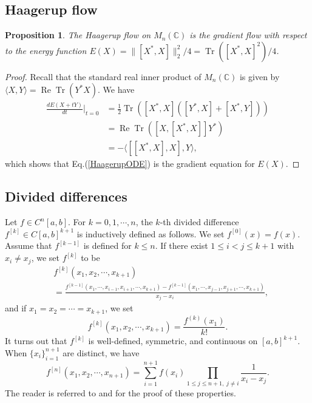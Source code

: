 \documentclass[12pt]{article}
\newtheorem{proposition}[theorem]{Proposition}
\theoremstyle{definition}
\numberwithin{equation}{section}
\newcommand{\C}{\mathbb{C}}
\DeclareMathOperator{\Tr}{Tr}
\renewcommand{\Re}{\operatorname{Re}}
\newcommand{\inpr}[2]{\langle{#1,#2}\rangle}
\begin{document}
\subsection{Haagerup flow}
\begin{proposition}\label{gradient} The Haagerup flow on $M_n(\C)$ is the gradient flow with respect to 
	the energy function $E(X)=\|[X^*,X]\|_2^2/4=\Tr([X^*,X]^2)/4$. 
\end{proposition}

\begin{proof}
	Recall that the standard real inner product of $M_n(\C)$ is given by 
	$\inpr{X}{Y}=\Re\Tr(Y^*X)$.  	
	We have 
	\begin{align*}
		\frac{dE(X+tY)}{dt}{\bigg|}_{t=0} &=\frac{1}{2}\Tr([X^*,X]([Y^*,X]+[X^*,Y]))\\
		&=\Re \Tr([X,[X^*,X]]Y^*)\\
		&=-\inpr{[[X^*,X],X]}{Y},
	\end{align*}
	which shows that Eq.(\ref{HaagerupODE}) is the gradient equation for $E(X)$. 
\end{proof}

\subsection{Divided differences}
Let $f\in C^n[a,b]$. 
For $k=0,1,\cdots, n$, the $k$-th divided difference $f^{[k]}\in C[a,b]^{k+1}$ is inductively defined as follows. 
We set $f^{[0]}(x)=f(x)$. 
Assume that $f^{[k-1]}$ is defined for $k\leq n$. 
If there exist $1\leq i<j\leq k+1$ with $x_i\neq x_j$, we set $f^{[k]}$ to be
\begin{align*}
	 &f^{[k]}(x_1,x_2,\cdots,x_{k+1})  \\
	&= \frac{f^{[k-1]}(x_1,\cdots,x_{i-1},x_{i+1},\cdots, x_{k+1})-f^{[k-1]}(x_1,\cdots,x_{j-1},x_{j+1},\cdots,x_{k+1})}{x_j-x_i},
\end{align*}
and if $x_1=x_2=\cdots=x_{k+1}$, we set 
\[f^{[k]}(x_1,x_2,\cdots,x_{k+1}) =\frac{f^{(k)}(x_1)}{k!}.\]
It turns out that $f^{[k]}$ is well-defined, symmetric, and continuous on $[a,b]^{k+1}$. 
When $\{x_i\}_{i=1}^{n+1}$ are distinct, we have 
\[f^{[n]}(x_1,x_2,\cdots,x_{n+1})=\sum_{i=1}^{n+1}f(x_i)\prod_{1\leq j\leq n+1,\;j\neq i}\frac{1}{x_i-x_j}.\] 
The reader is referred to \cite[Lemma 2.2.4]{H2010} and \cite[Chapter 6.1.14]{HJ1991} for the proof of these properties. 
\end{document}
